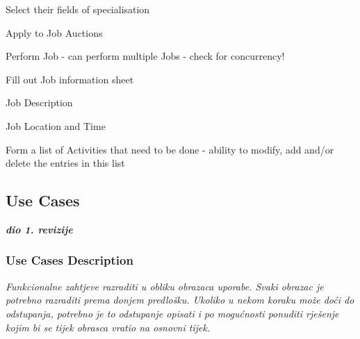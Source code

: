 \begin{packed_enum}
				\item {}
				\begin{packed_enum}
					\item Select their fields of specialisation
					\item Apply to Job Auctions
					\item Perform Job - can perform multiple Jobs - check for concurrency!
					\item Fill out Job information sheet
					\begin{packed_enum}
						\item Job Description
						\item Job Location and Time
						\item Form a list of Activities that need to be done - ability to modify, add and/or delete the entries in this list
					\end{packed_enum}
				\end{packed_enum}
				
			\end{packed_enum}
			\eject
				
			\subsection{Use Cases}
				
				\textbf{\textit{dio 1. revizije}}
				
				\subsubsection{Use Cases Description}
					\textit{Funkcionalne zahtjeve razraditi u obliku obrazaca uporabe. Svaki obrazac je potrebno razraditi prema donjem predlošku. Ukoliko u nekom koraku može doći do odstupanja, potrebno je to odstupanje opisati i po mogućnosti ponuditi rješenje kojim bi se tijek obrasca vratio na osnovni tijek.}\\
					

